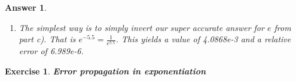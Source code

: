 \documentclass[12pt]{article}
\theoremstyle{colon}
\newtheorem{exercise}{Exercise}
\newtheorem*{answer}{Answer}
\begin{document}
\begin{answer}
\begin{enumerate}[label=\alph*)]
\begin{enumerate}[label=\roman*)]
        \item Right to Left, Positive then Negative: The value converges to 5 significant figures to 1.0000e-2. The relative error with the built-in function was 1.447. This is the worst performance and again is caused by the cancellation of the positive and negative part with a slight mismatch due to higher precision from adding right to left.
      \end{enumerate}

    \item The simplest way is to simply invert our super accurate answer for $e$ from part c). That is $e^{-5.5} = \frac{1}{e^{5.5}}$. This yields a value of 4.0868e-3 and a relative error of 6.989e-6.
  \end{enumerate}
\end{answer}

\clearpage

\begin{exercise}
  \textbf{Error propagation in exponentiation}
\end{exercise}
\end{document}
